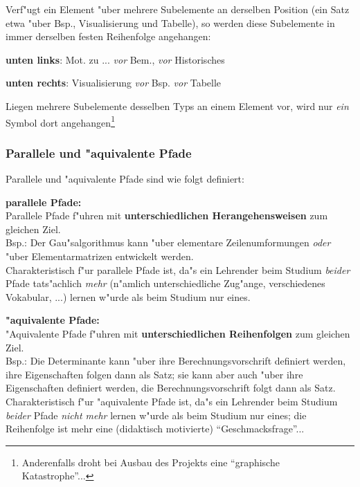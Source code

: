 Verf"ugt ein Element "uber mehrere Subelemente an derselben Position
(ein Satz etwa "uber Bsp., Visualisierung und Tabelle), so werden
diese Subelemente in immer derselben festen Reihenfolge angehangen:

\begin{list_sabina}
        \item 
	\textbf{unten links}: Mot. zu ... \textit{vor} Bem., \textit{vor} Historisches
        \item 
	\textbf{unten rechts}: Visualisierung \textit{vor} Bsp. \textit{vor} Tabelle
\end{list_sabina}



Liegen mehrere Subelemente desselben Typs an einem Element vor, wird
nur \textit{ein} Symbol dort angehangen\footnote{Anderenfalls droht
bei Ausbau des Projekts eine ``graphische Katastrophe''...}


\subsubsection{Parallele und "aquivalente Pfade}

Parallele und "aquivalente Pfade sind wie folgt definiert:

\begin{list_sabina}
        \item 
	\textbf{parallele Pfade:}\\
	Parallele Pfade f"uhren mit \textbf{unterschiedlichen
	Herangehensweisen} zum gleichen Ziel. \\
	Bsp.: Der Gau"salgorithmus kann "uber elementare Zeilenumformungen
	\textit{oder} "uber Elementarmatrizen entwickelt werden. \\
	Charakteristisch f"ur parallele Pfade ist, da"s ein Lehrender
	beim Studium \textit{beider} Pfade tats"achlich \textit{mehr}
	(n"amlich unterschiedliche Zug"ange, verschiedenes Vokabular, ...)
	lernen w"urde als beim Studium nur eines.
        \item 
	\textbf{"aquivalente Pfade:}\\
	"Aquivalente Pfade f"uhren mit \textbf{unterschiedlichen
	Reihenfolgen} zum gleichen Ziel. \\
	Bsp.: Die Determinante kann "uber ihre Berechnungsvorschrift
	definiert werden, ihre Eigenschaften folgen dann als Satz;
	sie kann aber auch "uber ihre Eigenschaften definiert werden,
	die Berechnungsvorschrift folgt dann als Satz. \\
	Charakteristisch f"ur "aquivalente Pfade ist, da"s ein Lehrender
	beim Studium \textit{beider} Pfade \textit{nicht mehr} 
	lernen w"urde als beim Studium nur eines;
	die Reihenfolge ist mehr eine (didaktisch motivierte)
	``Geschmacksfrage''...
\end{list_sabina}

